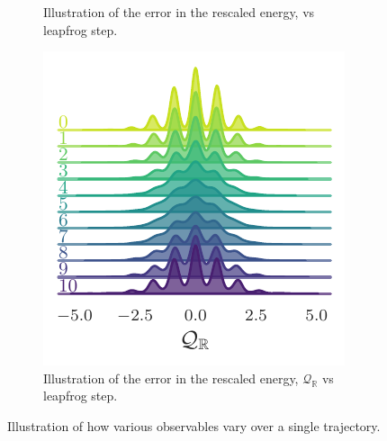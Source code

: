\documentclass{article} %
\begin{document}
\begin{figure}[htpb]
\begin{subfigure}{0.31\textwidth}
      \caption{\label{fig:hwf}Illustration of the error in the rescaled energy,
      vs leapfrog step.}
   \end{subfigure}
   \hfill
   \begin{subfigure}{0.31\textwidth}
      \includegraphics[width=\textwidth]{figures/sinQf.pdf}
      \caption{\label{fig:sinQf}Illustration of the error in the rescaled energy, \(\mathcal{Q}_{\mathbb{R}}\) vs
      leapfrog step.}%
      \end{subfigure}
   \caption{\label{fig:transformations}Illustration of how various observables vary over a single trajectory.}
\end{figure}
%
\end{document}
